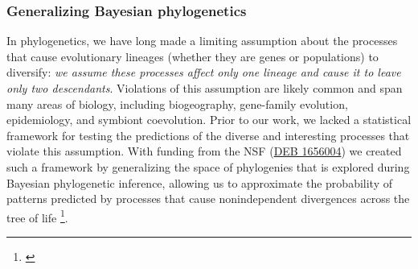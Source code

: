 
\subsubsection*{Generalizing Bayesian phylogenetics}
In phylogenetics, we have long made a limiting assumption about the processes
that cause evolutionary lineages (whether they are genes or populations) to
diversify: \textit{we assume these processes affect only one lineage and cause
    it to leave only two descendants}.
Violations of this assumption are likely common and span many areas of biology,
including biogeography, gene-family evolution, epidemiology, and symbiont
coevolution.
Prior to our work, we
lacked a statistical framework for testing the predictions of the
diverse and interesting processes that violate this assumption.
With funding from the NSF
(\href{https://www.nsf.gov/awardsearch/showAward?AWD_ID=1656004&HistoricalAwards=false}{DEB 1656004})
we created such a framework by generalizing the space of phylogenies that is
explored during Bayesian phylogenetic inference,
allowing us to approximate the probability
of patterns predicted by processes that cause nonindependent divergences 
across the tree of life
\footnote{\label{Oaks21phycoeval}\hspace{-0.8em}}.

